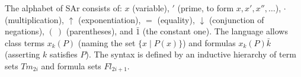 The alphabet of SAr consists of: $x$ (variable), $'$ (prime, to form $x, x', x'', \ldots$), $\cdot$ (multiplication), $\uparrow$ (exponentiation), $=$ (equality), $\downarrow$ (conjunction of negations), $(~)$ (parentheses), and $\bar{1}$ (the constant one). The language allows class terms $x_k(P)$ (naming the set $\{x \mid P(x)\}$) and formulas $x_k(P)\bar{k}$ (asserting $k$ satisfies $P$). The syntax is defined by an inductive hierarchy of term sets $Tm_{2i}$ and formula sets $Fl_{2i+1}$.
